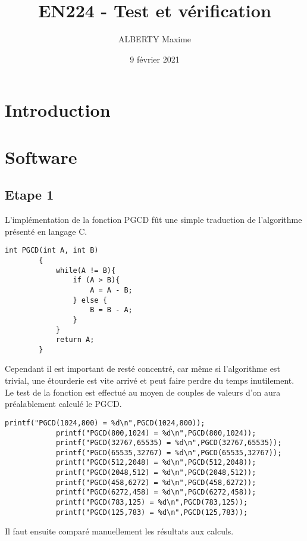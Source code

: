 \documentclass[a4paper]{article}
\title{EN224 - Test et vérification}
\author{ALBERTY Maxime}
\date{9 février 2021}
\begin{document}
\maketitle

\tableofcontents

\newpage %

\section{Introduction}

\section{Software}
    \subsection{Etape 1}
        L'implémentation de la fonction PGCD fût une simple traduction de l'algorithme présenté en langage C.
        \begin{lstlisting}[style=CStyle]
        int PGCD(int A, int B)
        {
        	while(A != B){
        		if (A > B){
        			A = A - B;
        		} else {
        			B = B - A;
        		}
        	}
        	return A;
        }
        \end{lstlisting}
        
        Cependant il est important de resté concentré, car même si l'algorithme est trivial, une étourderie est vite arrivé et peut faire perdre du temps inutilement.
        \\
        
        Le test de la fonction est effectué au moyen de couples de valeurs d'on aura préalablement calculé le PGCD. 
        \begin{lstlisting}[style=CStyle]
        	printf("PGCD(1024,800) = %d\n",PGCD(1024,800));
        	printf("PGCD(800,1024) = %d\n",PGCD(800,1024));
        	printf("PGCD(32767,65535) = %d\n",PGCD(32767,65535));
        	printf("PGCD(65535,32767) = %d\n",PGCD(65535,32767));
        	printf("PGCD(512,2048) = %d\n",PGCD(512,2048));
        	printf("PGCD(2048,512) = %d\n",PGCD(2048,512));
        	printf("PGCD(458,6272) = %d\n",PGCD(458,6272));
        	printf("PGCD(6272,458) = %d\n",PGCD(6272,458));
        	printf("PGCD(783,125) = %d\n",PGCD(783,125));
        	printf("PGCD(125,783) = %d\n",PGCD(125,783));
        \end{lstlisting}
        Il faut ensuite comparé manuellement les résultats aux calculs.
        
\end{document}
